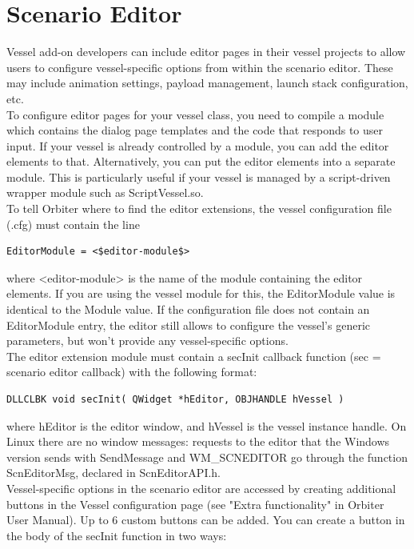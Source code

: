 \documentclass[Orbiter Developer Manual.tex]{subfiles}
\begin{document}
\section{Scenario Editor}
Vessel add-on developers can include editor pages in their vessel projects to allow users to configure vessel-specific options from within the scenario editor. These may include animation settings, payload management, launch stack configuration, etc.\\
To configure editor pages for your vessel class, you need to compile a module which contains the dialog page templates and the code that responds to user input. If your vessel is already controlled by a module, you can add the editor elements to that. Alternatively, you can put the editor elements into a separate module. This is particularly useful if your vessel is managed by a script-driven wrapper module such as ScriptVessel.so.\\
To tell Orbiter where to find the editor extensions, the vessel configuration file (.cfg) must contain the line

\begin{lstlisting}[language=OSFS,mathescape=true]
EditorModule = <$editor-module$>
\end{lstlisting}

\noindent
where <editor-module> is the name of the module containing the editor elements. If you are using the vessel module for this, the EditorModule value is identical to the Module value. If the configuration file does not contain an EditorModule entry, the editor still allows to configure the vessel's generic parameters, but won't provide any vessel-specific options.\\
The editor extension module must contain a secInit callback function (sec = scenario editor callback) with the following format:

\begin{lstlisting}
DLLCLBK void secInit( QWidget *hEditor, OBJHANDLE hVessel )
\end{lstlisting}

\noindent
where hEditor is the editor window, and hVessel is the vessel instance handle. On Linux there are no window messages: requests to the editor that the Windows version sends with SendMessage and WM\_SCNEDITOR go through the function ScnEditorMsg, declared in ScnEditorAPI.h.\\
Vessel-specific options in the scenario editor are accessed by creating additional buttons in the Vessel configuration page (see "Extra functionality" in Orbiter User Manual). Up to 6 custom buttons can be added. You can create a button in the body of the secInit function in two ways:
\end{document}
